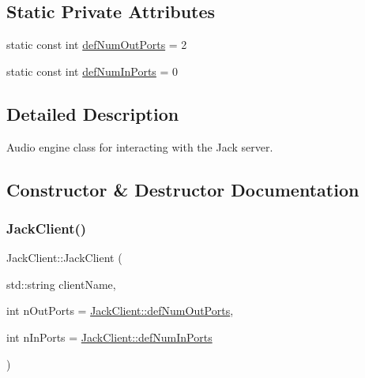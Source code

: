 \subsection*{Static Private Attributes}
\begin{DoxyCompactItemize}
\item 
static const int \hyperlink{classdrumpi_1_1audio_1_1JackClient_a4041995639d6765bb34dbadf27f7c3ec}{def\+Num\+Out\+Ports} = 2
\item 
static const int \hyperlink{classdrumpi_1_1audio_1_1JackClient_abffcd237af5b33cb60bc93f4c0af3efa}{def\+Num\+In\+Ports} = 0
\end{DoxyCompactItemize}


\subsection{Detailed Description}
Audio engine class for interacting with the Jack server. 

\subsection{Constructor \& Destructor Documentation}
\mbox{\label{classdrumpi_1_1audio_1_1JackClient_ab4cf3d533282d89dc9e1be8a64e22676}} 
\subsubsection{\texorpdfstring{Jack\+Client()}{JackClient()}}
{\footnotesize\ttfamily Jack\+Client\+::\+Jack\+Client (\begin{DoxyParamCaption}\item[{std\+::string}]{client\+Name,  }\item[{int}]{n\+Out\+Ports = {\ttfamily \hyperlink{classdrumpi_1_1audio_1_1JackClient_a4041995639d6765bb34dbadf27f7c3ec}{Jack\+Client\+::def\+Num\+Out\+Ports}},  }\item[{int}]{n\+In\+Ports = {\ttfamily \hyperlink{classdrumpi_1_1audio_1_1JackClient_abffcd237af5b33cb60bc93f4c0af3efa}{Jack\+Client\+::def\+Num\+In\+Ports}} }\end{DoxyParamCaption})}


